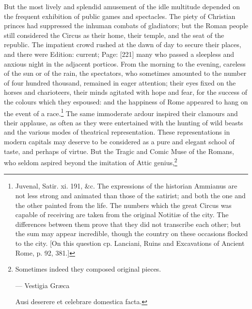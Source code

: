 But the most lively and splendid amusement of the idle multitude depended on the frequent exhibition of public games and spectacles. The piety of Christian princes had suppressed the inhuman combats of gladiators; but the Roman people still considered the Circus as their home, their temple, and the seat of the republic. The impatient crowd rushed at the dawn of day to secure their places, and there were Edition: current; Page: [221] many who passed a sleepless and anxious night in the adjacent porticos. From the morning to the evening, careless of the sun or of the rain, the spectators, who sometimes amounted to the number of four hundred thousand, remained in eager attention; their eyes fixed on the horses and charioteers, their minds agitated with hope and fear, for the success of the colours which they espoused: and the happiness of Rome appeared to hang on the event of a race.\footnote{Juvenal, Satir. xi. 191, \&c. The expressions of the historian Ammianus are not less strong and animated than those of the satirist; and both the one and the other painted from the life. The numbers which the great Circus was capable of receiving are taken from the original Notitiæ of the city. The differences between them prove that they did not transcribe each other; but the sum may appear incredible, though the country on these occasions flocked to the city. [On this question cp. Lanciani, Ruins and Excavations of Ancient Rome, p. 92, 381.]} The same immoderate ardour inspired their clamours and their applause, as often as they were entertained with the hunting of wild beasts and the various modes of theatrical representation. These representations in modern capitals may deserve to be considered as a pure and elegant school of taste, and perhaps of virtue. But the Tragic and Comic Muse of the Romans, who seldom aspired beyond the imitation of Attic genius,\footnote{Sometimes indeed they composed original pieces.

\texthebrew{—} Vestigia Græca

Ausi deserere et celebrare domestica facta.

}
